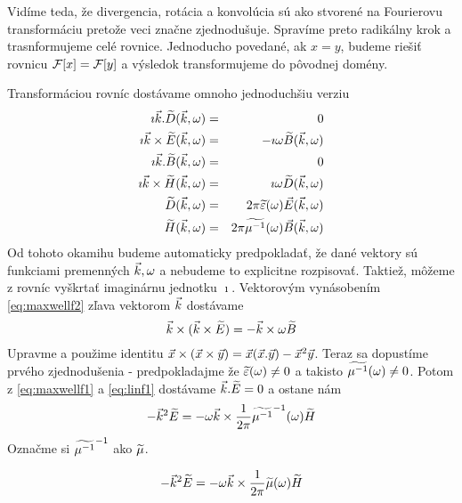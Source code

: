 Vidíme teda, že divergencia, rotácia a konvolúcia sú ako stvorené na
Fourierovu transformáciu pretože veci značne zjednodušuje. Spravíme
preto radikálny krok a trasnformujeme celé rovnice. Jednoducho
povedané, ak $x=y$, budeme riešiť rovnicu $\mathcal{F}[x]=\mathcal{F}[y]$ a
výsledok transformujeme do pôvodnej domény.

Transformáciou rovníc dostávame omnoho jednoduchšiu verziu
\begin{eqnarray}
\imath \vec{k} . \widetilde{D}{(\vec{k},\omega)} &=& 0 \label{eq:maxwellf1} \\
\imath \vec{k} \times \widetilde{E}{(\vec{k},\omega)} &=& - \imath \omega \widetilde{B}{(\vec{k},\omega)}
\label{eq:maxwellf2} \\
\imath \vec{k} . \widetilde{B}{(\vec{k},\omega)} &=& 0 \label{eq:maxwellf3}\\
\imath \vec{k} \times \widetilde{H}{(\vec{k},\omega)} &=& \imath \omega \widetilde{D}{(\vec{k},\omega)} \label{eq:maxwellf4}\\
\widetilde{D}{(\vec{k},\omega)} &=& 2 \pi \widetilde{\varepsilon}(\omega) \vec{E}{(\vec{k},\omega)} \label{eq:linf1}\\
\widetilde{H}{(\vec{k},\omega)} &=& 2 \pi \widetilde{\mu^{-1}}(\omega) \vec{B}{(\vec{k},\omega)}
\label{eq:linf2}
\end{eqnarray}
Od tohoto okamihu budeme automaticky predpokladať, že dané vektory sú
funkciami premenných $\vec{k},\omega$ a nebudeme to explicitne
rozpisovať.
Taktiež, môžeme z rovníc vyškrtať imaginárnu jednotku $\imath$.
Vektorovým vynásobením \ref{eq:maxwellf2} zľava vektorom $\vec{k}$
dostávame
\begin{equation*}
    \vec{k} \times (\vec{k} \times \widetilde{E}) = - \vec{k}\times
    \omega \widetilde{B}
\end{equation*}
Upravme a použime identitu $\vec{x} \times (\vec{x} \times
\vec{y}) = \vec{x} (\vec{x} . \vec{y}) - \vec{x}^2
\vec{y}$. Teraz sa dopustíme prvého zjednodušenia - predpokladajme
že $\widetilde{\varepsilon}(\omega)\not=0$ a takisto
$\widetilde{\mu^{-1}}(\omega)\not=0$. Potom z \ref{eq:maxwellf1} a \ref{eq:linf1} dostávame
$\vec{k}.\widetilde{E}=0$ a ostane nám
\begin{equation*}
    - \vec{k}^2 \widetilde{E} = - \omega \vec{k} \times
    \frac{1}{2 \pi} \widetilde{\mu^{-1}}^{-1}(\omega) \widetilde{H}
\end{equation*}
Označme si $\widetilde{\mu^{-1}}^{-1}$ ako $\widetilde{\mu}$.

\begin{equation*}
    - \vec{k}^2 \widetilde{E} = - \omega \vec{k} \times
    \frac{1}{2 \pi} \widetilde{\mu}(\omega) \widetilde{H}
\end{equation*}


